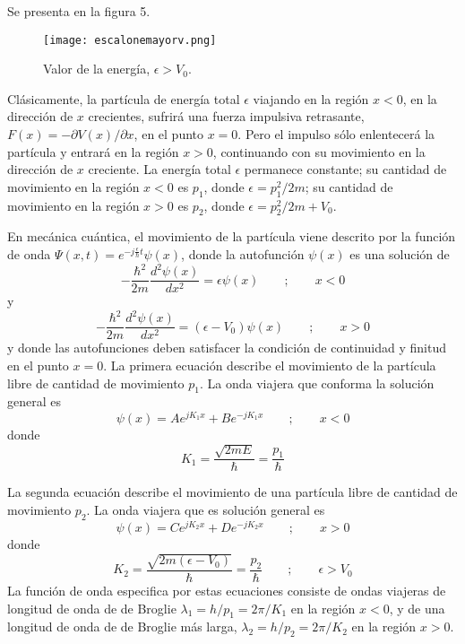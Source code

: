 \documentclass[12pt,a4paper]{article}
\def\e{{\epsilon}} %
\begin{document}
Se presenta en la figura 5.

\begin{figure}[ht!]
\begin{center}
\texttt{[image: escalonemayorv.png]}
\caption{Valor de la energía, $\e>V_{0}$.}
\end{center}
\end{figure}

Clásicamente, la partícula de energía total $\e$ viajando en la región $x<0$, en la dirección de $x$ crecientes, sufrirá una fuerza impulsiva retrasante, $F(x)=-\partial V(x)/\partial x$, en el punto $x=0$. Pero el impulso sólo enlentecerá la partícula y entrará en la región $x>0$, continuando con su movimiento en la dirección de $x$ creciente. La energía total $\e$ permanece constante; su cantidad de movimiento en la región $x<0$ es $p_{1}$, donde $\e=p_{1}^{2}/2m$; su cantidad de movimiento en la región $x>0$ es $p_{2}$, donde $\e=p_{2}^{2}/2m+V_{0}$.

En mecánica cuántica, el movimiento de la partícula viene descrito por la función de onda $\Psi (x,t)=e^{-j\frac{\e}{\hbar}t}\psi(x)$, donde la autofunción $\psi (x)$ es una solución de
\[ -\frac{\hbar^{2}}{2m}\frac{d^{2}\psi(x)}{dx^{2}}=\e \psi(x) \qquad ; \qquad x< 0 \]
y
\[ -\frac{\hbar^{2}}{2m}\frac{d^{2}\psi(x)}{dx^{2}}=(\e-V_{0})\psi(x) \qquad ; \qquad x>0 \]
y donde las autofunciones deben satisfacer la condición de continuidad y finitud en el punto $x=0$. La primera ecuación describe el movimiento de la partícula libre de cantidad de movimiento $p_{1}$. La onda viajera que conforma la solución general es
\[ \psi (x)=Ae^{jK_{1}x}+Be^{-jK_{1}x} \qquad ; \qquad x<0 \]
donde
\[ K_{1}=\frac{\sqrt{2mE}}{\hbar}=\frac{p_{1}}{\hbar} \]

La segunda ecuación describe el movimiento de una partícula libre de cantidad de movimiento $p_{2}$. La onda viajera que es solución general es
\[ \psi(x)=Ce^{jK_{2}x}+De^{-jK_{2}x} \qquad ; \qquad x>0 \]
donde
\[ K_{2}=\frac{\sqrt{2m(\e-V_{0})}}{\hbar}=\frac{p_{2}}{\hbar} \qquad ; \qquad \e > V_{0} \]
La función de onda especifica por estas ecuaciones consiste de ondas viajeras de longitud de onda de de Broglie $\lambda _{1}=h/p_{1}=2\pi/K_{1}$ en la región $x<0$, y de una longitud de onda de de Broglie más larga, $\lambda _{2}=h/p_{2}=2\pi/K_{2}$ en la región $x>0$.
\end{document}

